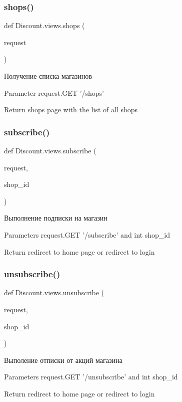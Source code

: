 \subsubsection{\texorpdfstring{shops()}{shops()}}
{\footnotesize\ttfamily def Discount.\+views.\+shops (\begin{DoxyParamCaption}\item[{}]{request }\end{DoxyParamCaption})}

\begin{DoxyVerb}Получение списка магазинов

Parameter
    request.GET '/shops'

Return
    shops page with the list of all shops
\end{DoxyVerb}
 \mbox{\label{namespace_discount_1_1views_a0b960c314da8b607db4cff5669781c7d}} 
\subsubsection{\texorpdfstring{subscribe()}{subscribe()}}
{\footnotesize\ttfamily def Discount.\+views.\+subscribe (\begin{DoxyParamCaption}\item[{}]{request,  }\item[{}]{shop\+\_\+id }\end{DoxyParamCaption})}

\begin{DoxyVerb}Выполнение подписки на магазин

Parameters
    request.GET '/subscribe' and int shop_id

Return
    redirect to home page
    or
    redirect to login
\end{DoxyVerb}
 \mbox{\label{namespace_discount_1_1views_a50ef4ece5895ac221b7a940de2f89ba1}} 
\subsubsection{\texorpdfstring{unsubscribe()}{unsubscribe()}}
{\footnotesize\ttfamily def Discount.\+views.\+unsubscribe (\begin{DoxyParamCaption}\item[{}]{request,  }\item[{}]{shop\+\_\+id }\end{DoxyParamCaption})}

\begin{DoxyVerb}Выполение отписки от акций магазина

Parameters
    request.GET '/unsubscribe' and int shop_id

Return
    redirect to home page
    or
    redirect to login
\end{DoxyVerb}
 